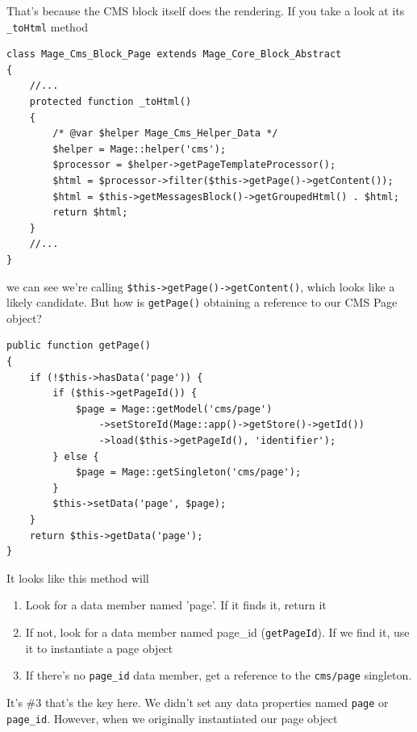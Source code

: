 \documentclass[oneside]{book}
\begin{document}
That's because the CMS block itself does the rendering.  If you take a look at its \footnotesize\texttt{\_toHtml} \normalsize  method

\begin{lstlisting}
class Mage_Cms_Block_Page extends Mage_Core_Block_Abstract
{
    //...
    protected function _toHtml()
    {
        /* @var $helper Mage_Cms_Helper_Data */
        $helper = Mage::helper('cms');
        $processor = $helper->getPageTemplateProcessor();
        $html = $processor->filter($this->getPage()->getContent());
        $html = $this->getMessagesBlock()->getGroupedHtml() . $html;
        return $html;
    }
    //...
}

\end{lstlisting}


we can see we're calling \footnotesize\texttt{\$this-\textgreater getPage()-\textgreater getContent()}\normalsize, which looks like a likely candidate.  But how is \footnotesize\texttt{getPage()} \normalsize  obtaining a reference to our CMS Page object?  

\begin{lstlisting}
public function getPage()
{
    if (!$this->hasData('page')) {
        if ($this->getPageId()) {
            $page = Mage::getModel('cms/page')
                ->setStoreId(Mage::app()->getStore()->getId())
                ->load($this->getPageId(), 'identifier');
        } else {
            $page = Mage::getSingleton('cms/page');
        }
        $this->setData('page', $page);
    }
    return $this->getData('page');
}

\end{lstlisting}


It looks like this method will

\begin{enumerate}
\item Look for a data member named 'page'.  If it finds it, return it
\item If not, look for a data member named page\_id (\footnotesize\texttt{getPageId}\normalsize). If we find it, use it to instantiate a page object
\item If there's no \footnotesize\texttt{page\_id} \normalsize  data member, get a reference to the \footnotesize\texttt{cms/page} \normalsize  singleton.
\end{enumerate}


It's \#3 that's the key here.  We didn't set any data properties named \footnotesize\texttt{page} \normalsize  or \footnotesize\texttt{page\_id}\normalsize.  However, when we originally instantiated our page object
\end{document}
